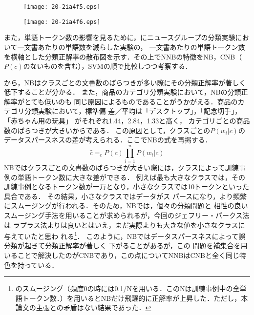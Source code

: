 \documentclass[japanese]{jnlp_1.4}
\newcommand{\figref}[1]{}
\newcommand{\argmax}{}
\begin{document}
\begin{figure}[b]
\begin{center}
\texttt{[image: 20-2ia4f5.eps]}
\end{center}
\label{Fig:標準偏差／平均}
\end{figure}
\begin{figure}[b]
\begin{center}
\texttt{[image: 20-2ia4f6.eps]}
\end{center}
\label{Fig:1文書ごとに平均した単語数}
\end{figure}

また，単語トークン数の影響を見るために，\figref{Fig:1文書ごとに平均した単語数}にニュースグループの分類実験において一文書あたりの単語数を減らした実験の，
一文書あたりの単語トークン数を横軸とした分類正解率の散布図を示す．その上でNNBの特徴をNB，CNB（$P(c)$のないものを含む），SVMの順で比較しつつ考察する．

\figref{Fig:標準偏差／平均}から，NBはクラスごとの文書数のばらつきが多い際にその分類正解率が著しく低下することが分かる．
また，商品のカテゴリ分類実験において，NBの分類正解率がとても低いのも
同じ原因によるものであることがうかがえる．商品のカテゴリ分類実験において，標準偏
\linebreak
差／平均は「デスクトップ」，「記念切手」，「赤ちゃん用の玩具」
がそれぞれ1.44，2.84，1.33と高く，
カテゴリごとの商品数のばらつきが大きいからである．
この原因として，クラスごとの$P(w_i|c)$のデータスパースネスの差が考えられる．ここでNBの式を再掲する．
\begin{equation}
\hat{c}=\argmax_{c} P(c) \prod_{i=1}^{n} P(w_i|c) \label{eq:rnb2}
\end{equation}
NBではクラスごとの文書数のばらつきが大きい際には，クラスによって訓練事例の単語トークン数に大きな差ができる．
例えば最も大きなクラスでは，その訓練事例となるトークン数が一万となり，小さなクラスでは10トークンといった具合である．
その結果，小さなクラスではデータがス
パースになり，より頻繁にスムージングが行われる．そのため，NBでは，個々の分類問題と
相性の良いスムージング手法を用いることが求められるが，今回のジェフリー・パークス法は
ラプラス法よりは良いとはいえ，まだ実際よりも大きな値を小さなクラスに与えていたと思わ
れる\footnote{のスムージング（頻度0の時には0.1/Nを用いる．このNは訓練事例中の全単語トークン数．）を用いるとNBだけ飛躍的に正解率が上昇した．ただし，本論文の主張との矛盾はない結果であった．}．
このように，NBではデータスパースネスによって誤分類が起きて分類正解率が著しく
下がることがあるが，この
問題を補集合を用いることで解決したのがCNBであり，この点についてNNBはCNBと全く同じ特色を持っている．
\end{document}

